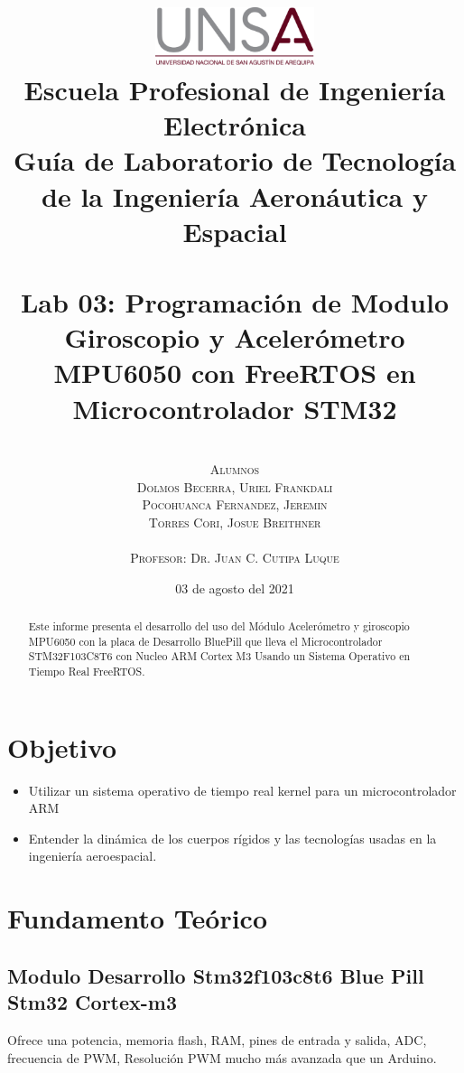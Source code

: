 \documentclass[12pt,oneside,spanish]{article}
\title{ 
	\includegraphics[width=0.35\textwidth]{unsa.eps}\\
	\vspace{0.1cm}
{\large Escuela Profesional de Ingeniería Electrónica \\
\vspace{2cm}
{\small Guía de Laboratorio de Tecnología de la Ingeniería Aeronáutica y Espacial}} \\ 
\vspace{0.1pt} 
\hrulefill \vspace{40pt} \\ 
\textbf{Lab 03: Programación de Modulo Giroscopio y Acelerómetro MPU6050 con FreeRTOS en Microcontrolador STM32}\\ 
\vspace{30pt} \hrulefill}
\author{\scshape{\textbf{ }}
\vspace{30pt} \\
	\vspace{0.5cm}
	{\small Alumnos}\\
	{\Large Dolmos Becerra, Uriel Frankdali}\\
	{\Large Pocohuanca Fernandez, Jeremin}\\
	{\Large Torres Cori, Josue Breithner}\\
	\vspace{3cm}\\
{\small Profesor: Dr. Juan C. Cutipa Luque}\\
\vspace{20pt}
}
\date{03 de agosto del 2021}
\begin{document}

\maketitle

\newpage

\begin{abstract}

Este informe presenta el desarrollo del uso del  Módulo Acelerómetro y giroscopio MPU6050 con la placa de Desarrollo BluePill que lleva el Microcontrolador STM32F103C8T6 con Nucleo ARM Cortex M3 Usando un Sistema Operativo en Tiempo Real FreeRTOS. 

\end{abstract}


\pagebreak

\tableofcontents

\newpage
{}

%
\section{Objetivo}
\begin{itemize}
    \item Utilizar un sistema operativo de tiempo real kernel para un microcontrolador ARM

    \item Entender la dinámica de los cuerpos rígidos y las tecnologías usadas en la ingeniería aeroespacial.

\end{itemize}

\section{Fundamento Teórico}
\subsection{Modulo Desarrollo Stm32f103c8t6 Blue Pill Stm32 Cortex-m3}
Ofrece una potencia, memoria flash, RAM, pines de entrada y salida, ADC, frecuencia de PWM, Resolución PWM mucho más avanzada que un Arduino.\\
\end{document}
